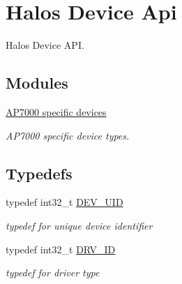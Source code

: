 \hypertarget{group___d_e_v_i_c_e___a_p_i}{
\section{Halos Device Api}
\label{group___d_e_v_i_c_e___a_p_i}
}
Halos Device API.  


\subsection*{Modules}
\begin{CompactItemize}
\item 
\hyperlink{group___a_p7000___d_e_v}{AP7000 specific devices}
\begin{CompactList}\small\item\em AP7000 specific device types. \item\end{CompactList}

\end{CompactItemize}
\subsection*{Typedefs}
\begin{CompactItemize}
\item 
\hypertarget{group___d_e_v_i_c_e___a_p_i_g9f427f7fc1dc07b788af60c2aaa6b8d3}{
typedef int32\_\-t \hyperlink{group___d_e_v_i_c_e___a_p_i_g9f427f7fc1dc07b788af60c2aaa6b8d3}{DEV\_\-UID}}
\label{group___d_e_v_i_c_e___a_p_i_g9f427f7fc1dc07b788af60c2aaa6b8d3}

\begin{CompactList}\small\item\em typedef for unique device identifier \item\end{CompactList}\item 
\hypertarget{group___d_e_v_i_c_e___a_p_i_g53a212d0c5c1447ccc5325ca00c90e98}{
typedef int32\_\-t \hyperlink{group___d_e_v_i_c_e___a_p_i_g53a212d0c5c1447ccc5325ca00c90e98}{DRV\_\-ID}}
\label{group___d_e_v_i_c_e___a_p_i_g53a212d0c5c1447ccc5325ca00c90e98}

\begin{CompactList}\small\item\em typedef for driver type \item\end{CompactList}\end{CompactItemize}
